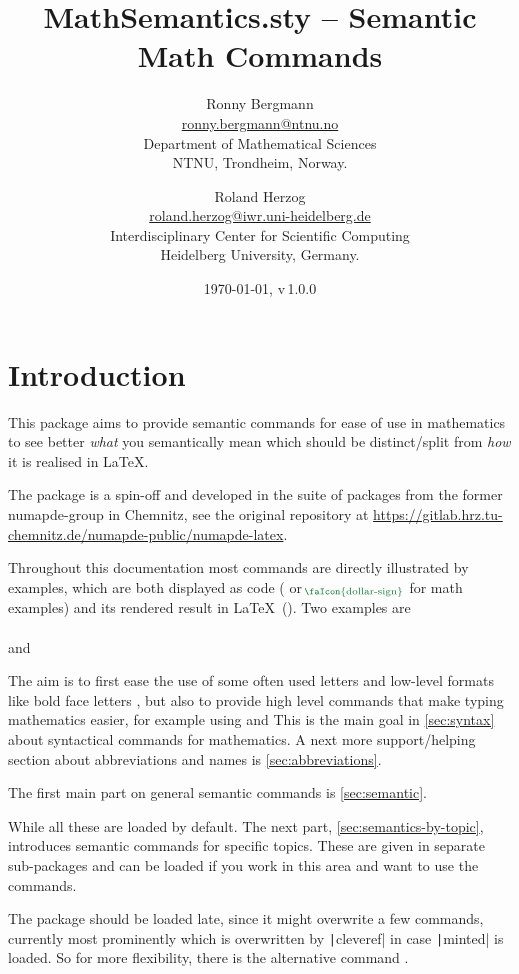 \documentclass[english,a4paper,DIV=12,parskip=full,oneside]{scrartcl}
\date{\today, v\,1.0.0}
\author{%
    Ronny Bergmann\\[.25\baselineskip]%
    \small\href{mailto:ronny.bergmann@ntnu.no}{ronny.bergmann@ntnu.no}\\[.125\baselineskip]
    \small Department of Mathematical Sciences\\%
    \small NTNU, Trondheim, Norway.%
    \and
    Roland Herzog\\[.25\baselineskip]%
    \small\href{mailto:roland.herzog@iwr.uni-heidelberg.de}{roland.herzog@iwr.uni-heidelberg.de}\\[.125\baselineskip]
    \small Interdisciplinary Center for Scientific Computing\\%
    \small Heidelberg University, Germany.%
    }
\title{MathSemantics.sty – Semantic Math Commands}
\begin{document}
    \maketitle
    \tableofcontents
    \section{Introduction}
    This package aims to provide semantic commands for ease of use in mathematics
    to see better \emph{what} you semantically mean which should be distinct/split
    from \emph{how} it is realised in \LaTeX.

    The package is a spin-off and developed in the suite of packages from the former numapde-group in Chemnitz,
    see the original repository at \url{https://gitlab.hrz.tu-chemnitz.de/numapde-public/numapde-latex}.

    Throughout this documentation most commands are directly illustrated by examples, which are
    both displayed as code ( or $_{\hspace{-.5ex}\text{\color{TolMutedGreen}\faIcon{dollar-sign}}}$ for math examples) and its rendered result in \LaTeX\ (\faEye[regular]).
    Two examples are\\
    \mathCodeExample{\bbR}\\
    and\\
    \codeExample{\eg}

    The aim is to first ease the use of some often used letters and low-level formats like
    bold face letters \mathCodeExample{\bbR}, but also to provide high level commands that
    make typing mathematics easier, for example using  and  
    This is the main goal in \cref{sec:syntax} about syntactical commands for mathematics.
    A next more support/helping section about abbreviations and names is \cref{sec:abbreviations}.

    The first main part on general semantic commands is \cref{sec:semantic}.

    While all these are loaded by default. The next part, \cref{sec:semantics-by-topic},
    introduces semantic commands for specific topics.
    These are given in separate sub-packages and can be loaded if you work in this area and want to use the commands.

    The package should be loaded late, since it might overwrite a few commands,
    currently most prominently \codeCommand{\d} which is overwritten by \texttt|cleveref| in case \texttt|minted| is loaded.
    So for more flexibility, there is the alternative command \codeCommand{\dInt}.
\end{document}
